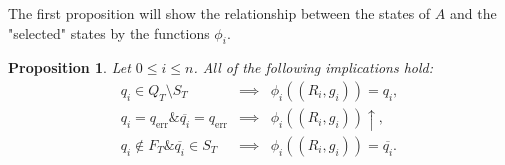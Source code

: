 \documentclass{article}
\newtheorem{proposition}[definition]{Proposition}
\begin{document}
	The first proposition will show the relationship between the states of $A$ and the "selected" states by the functions $\phi_i$.
	\begin{proposition} \label{prop:relationship_between_states_of_two-step_and_classical_bimachine}
		Let $0\le i\le n$. All of the following implications hold:
		\begin{eqnarray}
			q_i\in Q_T\setminus S_T &\implies& \phi_i((R_i, g_i)) = q_i,
				\label{prop:relationship_between_states_of_two-step_and_classical_bimachine:eq1} \\
			q_i = q_\mathrm{err} \mathbin\& \overline{q_i} = q_\mathrm{err} &\implies& \phi_i((R_i, g_i))\uparrow,
				\label{prop:relationship_between_states_of_two-step_and_classical_bimachine:eq2} \\
			q_i\notin F_T \mathbin\& \overline{q_i}\in S_T &\implies& \phi_i((R_i, g_i)) = \overline{q_i}.
				\label{prop:relationship_between_states_of_two-step_and_classical_bimachine:eq4}
		\end{eqnarray}
	\end{proposition}
\end{document}
